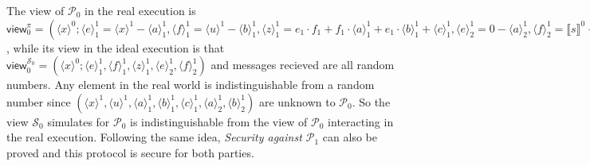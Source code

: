 \documentclass[letterpaper]{article} %
\begin{document}
    The view of $\mathcal{P}_{0}$ in the real execution is $\mathsf{view}_{0}^{\pi}=(\langle x\rangle ^{0};
    \langle e\rangle_{1}^{1}=\langle x\rangle^{1}-\langle a\rangle_{1}^{1},
    \langle f\rangle_{1}^{1}=\langle u\rangle^{1}-\langle b\rangle_{1}^{1},
    \langle z\rangle_{1}^{1} = e_{1} \cdot f_{1} + f_{1}\cdot \langle a\rangle_{1}^{1}
    +e_{1} \cdot \langle b\rangle^{1}_{1} + \langle c\rangle^{1}_{1},
    \langle e\rangle_{2}^{1}=0-\langle a\rangle_{2}^{1},
    \langle f\rangle_{2}^{1}=\llbracket s \rrbracket^{0}-\langle b\rangle_{2}^{1})$,
    while its view in the ideal execution is that
    $\mathsf{view}_{0}^{\mathcal{S}_{0}}=(\langle x\rangle ^{0};
    \langle e\rangle_{1}^{1},
    \langle f\rangle_{1}^{1},
    \langle z\rangle_{1}^{1},
    \langle e\rangle_{2}^{1},
    \langle f\rangle_{2}^{1})$
    and messages recieved are all random numbers.
    Any element in the real world
    is indistinguishable from a random number since
    $(\langle x\rangle^{1},\langle u\rangle^{1},
    \langle a\rangle_{1}^{1},\langle b\rangle_{1}^{1},\langle c\rangle^{1}_{1},
    \langle a\rangle_{2}^{1},\langle b\rangle_{2}^{1})$ are unknown to $\mathcal{P}_{0}$.
    So the view $\mathcal{S}_{0}$ simulates for $\mathcal{P}_{0}$ is indistinguishable
    from the view of $\mathcal{P}_{0}$ interacting in the real execution.
    Following the same idea, \emph{Security against $\mathcal{P}_{1}$} can also be proved and
    this protocol is secure for both parties.
\end{document}
